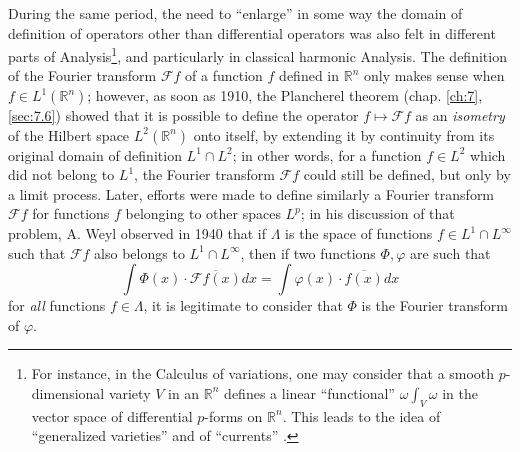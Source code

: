 \documentclass[12pt,a4paper,leqno,twoside]{extbook}
\newcommand{\R}{\mathbb{R}}
\begin{document}
During the same period, the need to ``enlarge'' in some way the domain of definition of operators other than differential operators was also felt in different parts of Analysis\footnote{For instance, in the Calculus of variations, one may consider that a smooth \(p\)-dimensional variety \(V\) in an \(\R^n\) defines a linear ``functional'' \(\omega \int_V \omega\) in the vector space of differential \(p\)-forms on \(\R^n\). This leads to the idea of ``generalized varieties'' \cite{231} and of ``currents'' \cite{049}.}, and particularly in classical harmonic Analysis. The definition of the Fourier transform \(\mathcal{F}f\) of a function \(f\) defined in \(\R^n\) only makes sense when \(f \in L^1(\R^n)\); however, as soon as 1910, the Plancherel theorem (chap. \ref{ch:7}, \ref{sec:7.6}) showed that it is possible to define the operator \(f \mapsto \mathcal{F}f\) as an \emph{isometry} of the Hilbert space \(L^2(\R^n)\) onto itself, by extending it by continuity from its original domain of definition \(L^1 \cap L^2\); in other words, for a function \(f \in L^2\) which did not belong to \(L^1\), the Fourier transform \(\mathcal{F}f\) could still be defined, but only by a limit process. Later, efforts were made to define similarly a Fourier transform \(\mathcal{F}f\) for functions \(f\) belonging to other spaces \(L^p\); in his discussion of that problem, A. Weyl observed in 1940 \cite[p.~118]{226} that if \(\Lambda\) is the space of functions \(f \in L^1 \cap L^\infty\) such that \(\mathcal{F}f\) also belongs to \(L^1 \cap L^\infty\), then if two functions \(\Phi, \varphi\) are such that
\begin{equation}
    \label{eq:8.10}
    \int \Phi(x) \cdot \overline{\mathcal{F}f(x)} dx = \int \varphi(x) \cdot \overline{f(x)} dx
\end{equation}
for \emph{all} functions \(f \in \Lambda\), it is legitimate to consider that \(\Phi\) is the Fourier transform of \(\varphi\).
\end{document}
